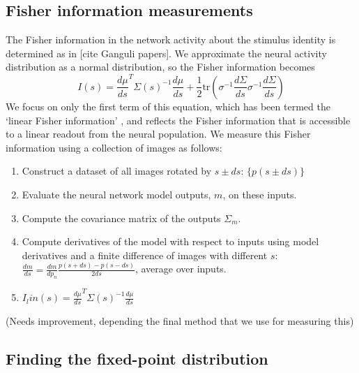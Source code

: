\documentclass[10pt]{article}      %
\begin{document}
\subsection{Fisher information measurements}
The Fisher information in the network activity about the stimulus identity is determined as in [cite Ganguli papers]. We approximate the neural activity distribution as a normal distribution, so the Fisher information becomes
\begin{equation}
  I(s) = \frac{d \mu}{ds}^T \Sigma(s)^{-1} \frac{d\mu}{ds} + \frac{1}{2} \textrm{tr}( \sigma^{-1} \frac{d \Sigma}{ds}\sigma^{-1} \frac{d \Sigma}{ds})
\end{equation}
We focus on only the first term of this equation, which has been termed the `linear Fisher information' \cite{kanitscheider_measuring_2015}, and reflects the Fisher information that is accessible to a linear readout from the neural population.
We measure this Fisher information using a collection of images as follows:
\begin{enumerate}
  \item Construct a dataset of all images rotated by $s \pm ds$: $\{p(s \pm ds)\}$
  \item Evaluate the neural network model outputs, $m$, on these inputs. 
  \item Compute the covariance matrix of the outputs $\Sigma_m$.
  \item Compute derivatives of the model with respect to inputs using model derivatives and a finite difference of images with different $s$: $\frac{dm}{ds} = \frac{dm}{d p_n} \frac{p(s + ds) - p(s - ds)}{2 ds} $, average over inputs.
  \item $I_lin(s) = \frac{d \mu}{ds}^T \Sigma(s)^{-1} \frac{d\mu}{ds}$
\end{enumerate}
(Needs improvement, depending the final method that we use for measuring this)

\subsection{Finding the fixed-point distribution}




\end{document}
